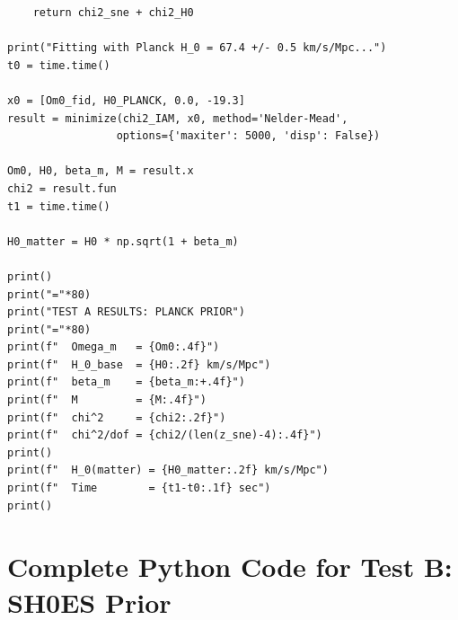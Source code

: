 \documentclass[twocolumn,superscriptaddress,prd,amsmath,amssymb]{revtex4-2}
\begin{document}
\begin{lstlisting}
    return chi2_sne + chi2_H0

print("Fitting with Planck H_0 = 67.4 +/- 0.5 km/s/Mpc...")
t0 = time.time()

x0 = [Om0_fid, H0_PLANCK, 0.0, -19.3]
result = minimize(chi2_IAM, x0, method='Nelder-Mead',
                 options={'maxiter': 5000, 'disp': False})

Om0, H0, beta_m, M = result.x
chi2 = result.fun
t1 = time.time()

H0_matter = H0 * np.sqrt(1 + beta_m)

print()
print("="*80)
print("TEST A RESULTS: PLANCK PRIOR")
print("="*80)
print(f"  Omega_m   = {Om0:.4f}")
print(f"  H_0_base  = {H0:.2f} km/s/Mpc")
print(f"  beta_m    = {beta_m:+.4f}")
print(f"  M         = {M:.4f}")
print(f"  chi^2     = {chi2:.2f}")
print(f"  chi^2/dof = {chi2/(len(z_sne)-4):.4f}")
print()
print(f"  H_0(matter) = {H0_matter:.2f} km/s/Mpc")
print(f"  Time        = {t1-t0:.1f} sec")
print()
\end{lstlisting}

\section{Complete Python Code for Test B: SH0ES Prior}
\label{app:test_b}
\end{document}
